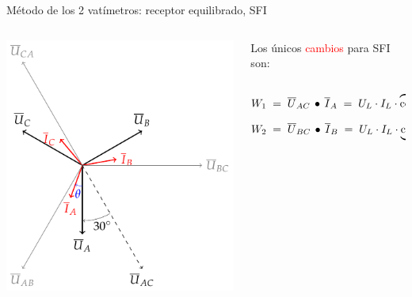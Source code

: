 \documentclass[aspectratio=169, usenames,svgnames,dvipsnames]{beamer}
\begin{document}

\begin{frame}{Método de los 2 vatímetros: \hspace{3mm}receptor equilibrado, \hspace{3mm}SFI}
    \begin{columns}
    \begin{column}{0.5\columnwidth}

        \vspace{3mm}
        \includegraphics[height=0.9\textheight]{../figs/fasores_potencia3H_SFI.pdf}
    \end{column}
    \begin{column}{0.5\columnwidth} 

        \vspace{-3mm}
        Los únicos \textcolor{red}{cambios} para \alert{SFI} son:

        \vspace{-7mm}
        \begin{align*}
    	    W_1& 
            \;=\; 
            \overline{U}_{AC}\,\bullet\,\overline{I}_A
            \;=\;
            U_L \cdot I_L \cdot \overbrace{\cos(\color{red}{30^\circ + \theta}\color{black}{)}}^{\text{ver gráfico}}\\[7pt] 
    	    W_2& 
            \;=\; 
            \overline{U}_{BC}\,\bullet\,\overline{I}_B
            \;=\;
            U_L \cdot I_L \cdot \underbrace{\cos(\color{red}{30^\circ - \theta}\color{black}{)}}_{\text{ver gráfico}}
    	\end{align*}


\end{column}
\end{columns}
\end{frame}
\end{document}
